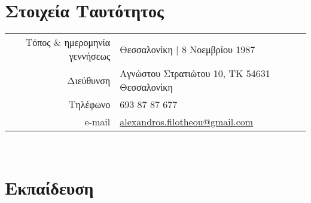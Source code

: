 \documentclass[a4paper,10pt,twoside]{article}
\begin{document}


\par{\bigskip\par}

\section{Στοιχεία Ταυτότητος}

\begin{tabular}{rp{10cm}}
Τόπος $\&$ ημερομηνία γεννήσεως 	& Θεσσαλονίκη | 8 Νοεμβρίου 1987 \\
Διεύθυνση           			        & Αγνώστου Στρατιώτου 10, ΤΚ 54631 Θεσσαλονίκη \\
Τηλέφωνο                          &  693 87 87 677 \\
e-mail                            & \href{mailto:alexandros.filotheou@gmail.com}{alexandros.filotheou@gmail.com}
\end{tabular}\\


\section{Εκπαίδευση}
\end{document}
